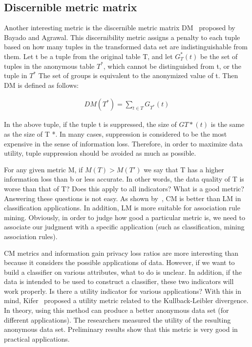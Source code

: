 \documentclass[journal,transmag]{IEEEtran}
\begin{document}
\subsection{Discernible metric matrix}
Another interesting metric is the discernible metric matrix DM~\cite{bayardo2005data} proposed by Bayado and Agrawal. This discernibility metric assigns a penalty to each tuple based on how many tuples in the transformed data set are indistinguishable from them. Let t be a tuple from the original table T, and let $G_T^*(t)$ be the set of tuples in the anonymous table $ T ^ * $, which cannot be distinguished from t, or the tuple in $T^*$ The set of groups is equivalent to the anonymized value of t. Then DM is defined as follows:

\begin{eqnarray}\label{DMformula}
DM(T^*)=\sum_{t \in T} G_{T^*} (t)
\end{eqnarray}

In the above tuple, if the tuple t is suppressed, the size of $GT * (t)$ is the same as the size of T *. In many cases, suppression is considered to be the most expensive in the sense of information loss. Therefore, in order to maximize data utility, tuple suppression should be avoided as much as possible.

For any given metric M, if $M(T)>M(T')$ we say that T has a higher information loss than b or less accurate. In other words, the data quality of T is worse than that of T? Does this apply to all indicators? What is a good metric? Answering these questions is not easy. As shown by~\cite{nergiz2007thoughts}, CM is better than LM in classification applications. In addition, LM is more suitable for association rule mining. Obviously, in order to judge how good a particular metric is, we need to associate our judgment with a specific application (such as classification, mining association rules).

CM metrics and information gain privacy loss ratios are more interesting than~\cite{bertino2005information}~\cite{sweeney2002achieving} because it considers the possible applications of data. However, if we want to build a classifier on various attributes, what to do is unclear. In addition, if the data is intended to be used to construct a classifier, these two indicators will work properly. Is there a utility indicator for various applications? With this in mind, Kifer~\cite{kifer2006injecting} proposed a utility metric related to the Kullback-Leibler divergence. In theory, using this method can produce a better anonymous data set (for different applications). The researchers measured the utility of the resulting anonymous data set. Preliminary results show that this metric is very good in practical applications.
\end{document}
